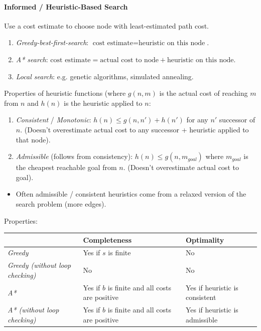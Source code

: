 \documentclass[twocolumn,english]{article}
\providecommand{\tabularnewline}{\\}
\providecommand{\tabularnewline}{\\}
\begin{document}
\paragraph{Informed / Heuristic-Based Search}

Use a cost estimate to choose node with least-estimated path cost.
\begin{enumerate}
\item \emph{Greedy-best-first-search}: $\text{cost estimate}=\text{heuristic on this node}$.
\item \emph{A{*} search}: $\text{cost estimate}=\text{actual cost to node}+\text{heuristic on this node}$.
\item \emph{Local search}: e.g. genetic algorithms, simulated annealing.
\end{enumerate}
Properties of heuristic functions (where $g\left(n,m\right)$ is the
actual cost of reaching $m$ from $n$ and $h\left(n\right)$ is the
heuristic applied to $n$:
\begin{enumerate}
\item \emph{Consistent} / \emph{Monotonic}: $h\left(n\right)\leq g\left(n,n'\right)+h\left(n'\right)$
for any $n'$ successor of $n$. (Doesn't overestimate actual cost
to any successor + heuristic applied to that node).
\item \emph{Admissible} (follows from consistency): $h\left(n\right)\leq g\left(n,m_{goal}\right)$
where $m_{goal}$ is the cheapest reachable goal from $n$. (Doesn't
overestimate actual cost to goal).
\end{enumerate}
\begin{itemize}
\item Often admissible / consistent heuristics come from a relaxed version
of the search problem (more edges).
\end{itemize}
Properties:

\begin{table}[H]
\centering{}%
\begin{tabular}{>{\centering}m{}>{\centering}m{}>{\centering}m{}}
\toprule 
 & \textbf{\footnotesize{}Completeness} & \textbf{\footnotesize{}Optimality}\tabularnewline
\midrule
\emph{\footnotesize{}Greedy} & {\footnotesize{}Yes if $s$ is finite} & {\footnotesize{}No}\tabularnewline
\emph{\footnotesize{}Greedy (without loop checking)} & {\footnotesize{}No} & {\footnotesize{}No}\tabularnewline
\midrule
\emph{\footnotesize{}A{*}} & {\footnotesize{}Yes if $b$ is finite and all costs are positive} & {\footnotesize{}Yes if heuristic is consistent}\tabularnewline
\emph{\footnotesize{}A{*} (without loop checking)} & {\footnotesize{}Yes if $b$ is finite and all costs are positive} & {\footnotesize{}Yes if heuristic is admissible}\tabularnewline
\bottomrule
\end{tabular}
\end{table}
\end{document}

